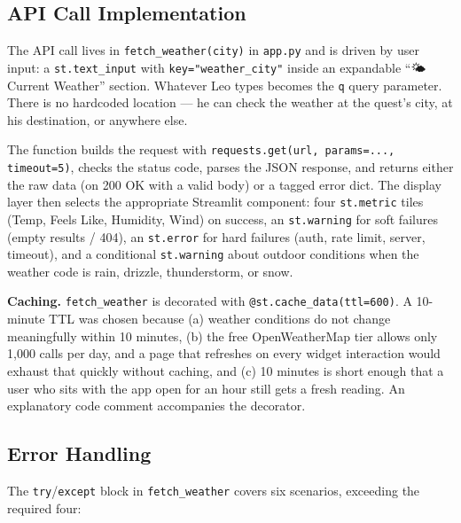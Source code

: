 \documentclass[11pt]{article}
\begin{document}
\subsection{API Call Implementation}

The API call lives in \texttt{fetch\_weather(city)} in \texttt{app.py} and is driven by user input: a \texttt{st.text\_input} with \texttt{key="weather\_city"} inside an expandable ``🌤️ Current Weather'' section. Whatever Leo types becomes the \texttt{q} query parameter. There is no hardcoded location --- he can check the weather at the quest's city, at his destination, or anywhere else.

The function builds the request with \texttt{requests.get(url, params=..., timeout=5)}, checks the status code, parses the JSON response, and returns either the raw data (on 200 OK with a valid body) or a tagged error dict. The display layer then selects the appropriate Streamlit component: four \texttt{st.metric} tiles (Temp, Feels Like, Humidity, Wind) on success, an \texttt{st.warning} for soft failures (empty results / 404), an \texttt{st.error} for hard failures (auth, rate limit, server, timeout), and a conditional \texttt{st.warning} about outdoor conditions when the weather code is rain, drizzle, thunderstorm, or snow.

\textbf{Caching.} \texttt{fetch\_weather} is decorated with \texttt{@st.cache\_data(ttl=600)}. A 10-minute TTL was chosen because (a) weather conditions do not change meaningfully within 10 minutes, (b) the free OpenWeatherMap tier allows only 1{,}000 calls per day, and a page that refreshes on every widget interaction would exhaust that quickly without caching, and (c) 10 minutes is short enough that a user who sits with the app open for an hour still gets a fresh reading. An explanatory code comment accompanies the decorator.

\subsection{Error Handling}

The \texttt{try}/\texttt{except} block in \texttt{fetch\_weather} covers six scenarios, exceeding the required four:
\end{document}
